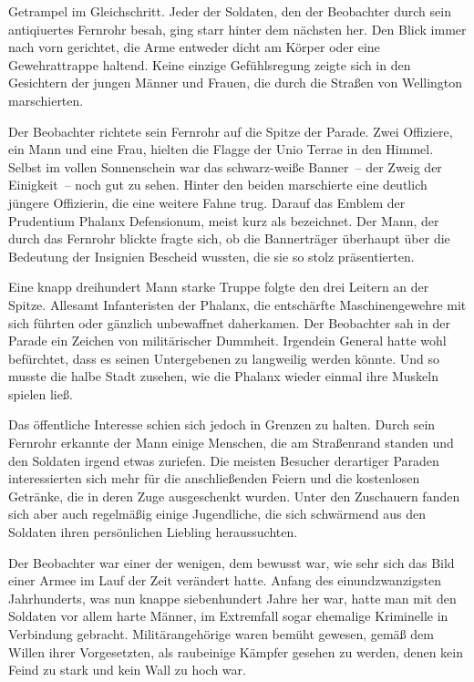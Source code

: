 Getrampel im Gleichschritt. Jeder der Soldaten, den der Beobachter durch sein antiqiuertes Fernrohr besah, ging starr hinter dem nächsten her. Den Blick immer nach vorn gerichtet, die Arme entweder dicht am Körper oder eine Gewehrattrappe haltend. Keine einzige Gefühlsregung zeigte sich in den Gesichtern der jungen Männer und Frauen, die durch die Straßen von Wellington marschierten.

\par

Der Beobachter richtete sein Fernrohr auf die Spitze der Parade. Zwei Offiziere, ein Mann und eine Frau, hielten die Flagge der Unio Terrae in den Himmel. Selbst im vollen Sonnenschein war das schwarz-weiße Banner~-- der Zweig der Einigkeit~-- noch gut zu sehen. Hinter den beiden marschierte eine deutlich jüngere Offizierin, die eine weitere Fahne trug. Darauf das Emblem der Prudentium Phalanx Defensionum, meist kurz als  bezeichnet. Der Mann, der durch das Fernrohr blickte fragte sich, ob die Bannerträger überhaupt über die Bedeutung der Insignien Bescheid wussten, die sie so stolz präsentierten.

\par

Eine knapp dreihundert Mann starke Truppe folgte den drei Leitern an der Spitze. Allesamt Infanteristen der Phalanx, die entschärfte Maschinengewehre mit sich führten oder gänzlich unbewaffnet daherkamen. Der Beobachter sah in der Parade ein Zeichen von militärischer Dummheit. Irgendein General hatte wohl befürchtet, dass es seinen Untergebenen zu langweilig werden könnte. Und so musste die halbe Stadt zusehen, wie die Phalanx wieder einmal ihre Muskeln spielen ließ.

\par

Das öffentliche Interesse schien sich jedoch in Grenzen zu halten. Durch sein Fernrohr erkannte der Mann einige Menschen, die am Straßenrand standen und den Soldaten irgend etwas zuriefen. Die meisten Besucher derartiger Paraden interessierten sich mehr für die anschließenden Feiern und die kostenlosen Getränke, die in deren Zuge ausgeschenkt wurden. Unter den Zuschauern fanden sich aber auch regelmäßig einige Jugendliche, die sich schwärmend aus den Soldaten ihren persönlichen Liebling heraussuchten.

\par

Der Beobachter war einer der wenigen, dem bewusst war, wie sehr sich das Bild einer Armee im Lauf der Zeit verändert hatte. Anfang des einundzwanzigsten Jahrhunderts, was nun knappe siebenhundert Jahre her war, hatte man mit den Soldaten vor allem harte Männer, im Extremfall sogar ehemalige Kriminelle in Verbindung gebracht. Militärangehörige waren bemüht gewesen, gemäß dem Willen ihrer Vorgesetzten, als raubeinige Kämpfer gesehen zu werden, denen kein Feind zu stark und kein Wall zu hoch war.

